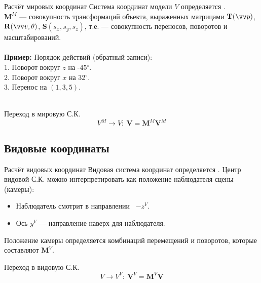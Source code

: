 \documentclass[10pt]{beamer}
\begin{document}
	\begin{frame}{Расчёт мировых координат}
		Система координат модели $V$ определяется . \\ 
		$\mathbf M^M$  --- совокупность трансформаций объекта, выраженных матрицами $\mathbf T(\vv p)$, $\mathbf R(\vv v, \theta)$, $\mathbf S(s_x,s_y,s_z)$, т.е. --- совокупность переносов, поворотов и масштабирований. \\ ~ \\
		
		\textbf{Пример:}
		{
			Порядок действий (обратный записи):\\
			1. Поворот вокруг $z$ на -45$^\circ$.\\
			2. Поворот вокруг $x$ на 32$^\circ$.\\
			3. Перенос на $(1,3,5)$.\\
		}  ~ \\		
		
		\begin{block}{Переход в мировую С.К.}
			$$
			V^M \rightarrow V: \ \mathbf V = \mathbf M^M \mathbf V ^M
			$$
		\end{block}
		
	\end{frame}
	
	\subsection{Видовые координаты}
	
	\begin{frame}{Расчёт видовых координат}
		Видовая система координат определяется . Центр видовой С.К. можно интерпретировать как положение наблюдателя сцены (камеры):
		 \begin{itemize}
		 	\item Наблюдатель смотрит в направлении \ $-z^V$.
		 	\item Ось $y^V$ --- направление наверх для наблюдателя.
		 \end{itemize}
		 
		 Положение камеры определяется комбинаций перемещений и поворотов, которые составляют $\mathbf M^V$. 
		 
		 \begin{block}{Переход в видовую С.К.}
		 	$$
		 	V \rightarrow V^V: \ \mathbf V^V = \mathbf M^V \mathbf V
		 	$$
		 \end{block}
		  
	\end{frame}
	
\end{document}

